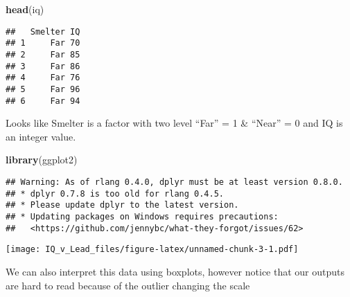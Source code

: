 \documentclass[]{article}
\newenvironment{Shaded}{\begin{snugshade}}{\end{snugshade}}
\newcommand{\KeywordTok}[1]{\textcolor[rgb]{0.13,0.29,0.53}{\textbf{#1}}}
\newcommand{\DataTypeTok}[1]{\textcolor[rgb]{0.13,0.29,0.53}{#1}}
\newcommand{\DecValTok}[1]{\textcolor[rgb]{0.00,0.00,0.81}{#1}}
\newcommand{\StringTok}[1]{\textcolor[rgb]{0.31,0.60,0.02}{#1}}
\newcommand{\OperatorTok}[1]{\textcolor[rgb]{0.81,0.36,0.00}{\textbf{#1}}}
\newcommand{\NormalTok}[1]{#1}
\begin{document}
\begin{Shaded}
\begin{Highlighting}[]
\KeywordTok{head}\NormalTok{(iq)}
\end{Highlighting}
\end{Shaded}

\begin{verbatim}
##   Smelter IQ
## 1     Far 70
## 2     Far 85
## 3     Far 86
## 4     Far 76
## 5     Far 96
## 6     Far 94
\end{verbatim}

Looks like Smelter is a factor with two level ``Far'' = 1 \& ``Near'' =
0 and IQ is an integer value.

\begin{Shaded}
\begin{Highlighting}[]
\KeywordTok{library}\NormalTok{(ggplot2)}
\end{Highlighting}
\end{Shaded}

\begin{verbatim}
## Warning: As of rlang 0.4.0, dplyr must be at least version 0.8.0.
## * dplyr 0.7.8 is too old for rlang 0.4.5.
## * Please update dplyr to the latest version.
## * Updating packages on Windows requires precautions:
##   <https://github.com/jennybc/what-they-forgot/issues/62>
\end{verbatim}

\begin{Shaded}
\end{Shaded}

\texttt{[image: IQ\_v\_Lead\_files/figure-latex/unnamed-chunk-3-1.pdf]}

We can also interpret this data using boxplots, however notice that our
outputs are hard to read because of the outlier changing the scale

\begin{Shaded}
\end{Shaded}
\end{document}
